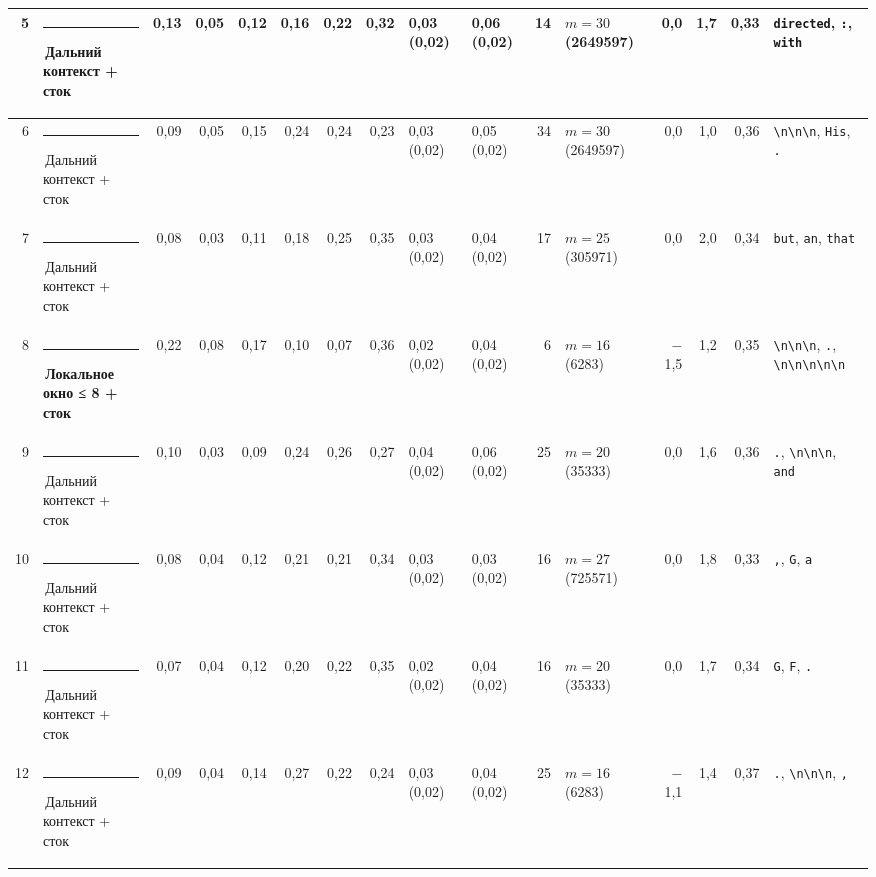 \documentclass[10pt]{article}
\begin{document}
\begin{minipage}{\linewidth}
\begin{center}
{\begin{tabular}{|r|l|r|r|r|r|r|r|l|l|r|l|r|r|r|l|}
5 & \textcolor[HTML]{C3C2B7}{\rule{0.62em}{0.62em}}\,Дальний контекст + сток & 0,13 & 0,05 & 0,12 & 0,16 & 0,22 & 0,32 & 0,03 (0,02) & 0,06 (0,02) & 14 & $m{=}30$ (2649597) & 0,0 & 1,7 & 0,33 & \texttt{\textvisiblespace{}directed}, \texttt{\textvisiblespace{}:}, \texttt{\textvisiblespace{}with} \\ \hline
6 & \textcolor[HTML]{C3C2B7}{\rule{0.62em}{0.62em}}\,Дальний контекст + сток & 0,09 & 0,05 & 0,15 & 0,24 & 0,24 & 0,23 & 0,03 (0,02) & 0,05 (0,02) & 34 & $m{=}30$ (2649597) & 0,0 & 1,0 & 0,36 & \texttt{\textvisiblespace{}\textbackslash{}n\textbackslash{}n\textbackslash{}n}, \texttt{\textvisiblespace{}His}, \texttt{\textvisiblespace{}.} \\ \hline
7 & \textcolor[HTML]{C3C2B7}{\rule{0.62em}{0.62em}}\,Дальний контекст + сток & 0,08 & 0,03 & 0,11 & 0,18 & 0,25 & 0,35 & 0,03 (0,02) & 0,04 (0,02) & 17 & $m{=}25$ (305971) & 0,0 & 2,0 & 0,34 & \texttt{\textvisiblespace{}but}, \texttt{\textvisiblespace{}an}, \texttt{\textvisiblespace{}that} \\ \hline
8 & \textcolor[HTML]{1BAF7A}{\rule{0.62em}{0.62em}}\,\textbf{Локальное окно ≤ 8 + сток} & 0,22 & 0,08 & 0,17 & 0,10 & 0,07 & 0,36 & 0,02 (0,02) & 0,04 (0,02) & 6 & $m{=}16$ (6283) & $-$1,5 & 1,2 & 0,35 & \texttt{\textvisiblespace{}\textbackslash{}n\textbackslash{}n\textbackslash{}n}, \texttt{\textvisiblespace{}.}, \texttt{\textbackslash{}n\textbackslash{}n\textbackslash{}n\textbackslash{}n\textbackslash{}n} \\ \hline
9 & \textcolor[HTML]{C3C2B7}{\rule{0.62em}{0.62em}}\,Дальний контекст + сток & 0,10 & 0,03 & 0,09 & 0,24 & 0,26 & 0,27 & 0,04 (0,02) & 0,06 (0,02) & 25 & $m{=}20$ (35333) & 0,0 & 1,6 & 0,36 & \texttt{\textvisiblespace{}.}, \texttt{\textvisiblespace{}\textbackslash{}n\textbackslash{}n\textbackslash{}n}, \texttt{\textvisiblespace{}and} \\ \hline
10 & \textcolor[HTML]{C3C2B7}{\rule{0.62em}{0.62em}}\,Дальний контекст + сток & 0,08 & 0,04 & 0,12 & 0,21 & 0,21 & 0,34 & 0,03 (0,02) & 0,03 (0,02) & 16 & $m{=}27$ (725571) & 0,0 & 1,8 & 0,33 & \texttt{\textvisiblespace{},}, \texttt{\textvisiblespace{}G}, \texttt{\textvisiblespace{}a} \\ \hline
11 & \textcolor[HTML]{C3C2B7}{\rule{0.62em}{0.62em}}\,Дальний контекст + сток & 0,07 & 0,04 & 0,12 & 0,20 & 0,22 & 0,35 & 0,02 (0,02) & 0,04 (0,02) & 16 & $m{=}20$ (35333) & 0,0 & 1,7 & 0,34 & \texttt{\textvisiblespace{}G}, \texttt{\textvisiblespace{}F}, \texttt{\textvisiblespace{}.} \\ \hline
12 & \textcolor[HTML]{C3C2B7}{\rule{0.62em}{0.62em}}\,Дальний контекст + сток & 0,09 & 0,04 & 0,14 & 0,27 & 0,22 & 0,24 & 0,03 (0,02) & 0,04 (0,02) & 25 & $m{=}16$ (6283) & $-$1,1 & 1,4 & 0,37 & \texttt{\textvisiblespace{}.}, \texttt{\textvisiblespace{}\textbackslash{}n\textbackslash{}n\textbackslash{}n}, \texttt{\textvisiblespace{},} \\ \hline

\end{tabular}}
\end{center}
\end{minipage}
\end{document}
